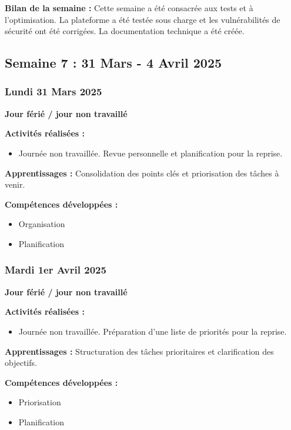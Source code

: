 \documentclass[12pt,a4paper]{article}
\begin{document}
\textbf{Bilan de la semaine :}
Cette semaine a été consacrée aux tests et à l'optimisation. La plateforme a été testée sous charge et les vulnérabilités de sécurité ont été corrigées. La documentation technique a été créée.

\clearpage
\subsection{Semaine 7 : 31 Mars - 4 Avril 2025}

\subsubsection{Lundi 31 Mars 2025}
\textbf{Jour férié / jour non travaillé}

\textbf{Activités réalisées :}
\begin{itemize}
    \item Journée non travaillée. Revue personnelle et planification pour la reprise.
\end{itemize}

\textbf{Apprentissages :}
Consolidation des points clés et priorisation des tâches à venir.

\textbf{Compétences développées :}
\begin{itemize}
    \item Organisation
    \item Planification
\end{itemize}

\subsubsection{Mardi 1er Avril 2025}
\textbf{Jour férié / jour non travaillé}

\textbf{Activités réalisées :}
\begin{itemize}
    \item Journée non travaillée. Préparation d'une liste de priorités pour la reprise.
\end{itemize}

\textbf{Apprentissages :}
Structuration des tâches prioritaires et clarification des objectifs.

\textbf{Compétences développées :}
\begin{itemize}
    \item Priorisation
    \item Planification
\end{itemize}
\end{document}
